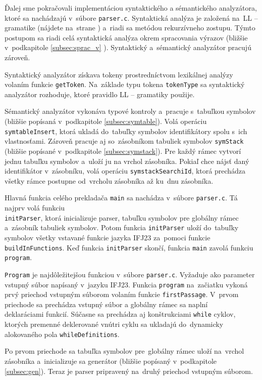 \documentclass[a4paper, 11pt]{article}
\begin{document}
Ďalej sme pokračovali implementáciou syntaktického a sémantického analyzátora, ktoré sa nachádzajú
v~súbore \texttt{parser.c}. Syntaktická analýza je založená na~LL -- gramatike (nájdete na~strane \pageref{tab:LL_gram}) a~riadi sa
metódou rekurzívneho zostupu. Týmto postupom sa riadi celá syntaktická analýza okrem spracovania výrazov (bližšie v~podkapitole \ref{subsec:sprac_v} ). Syntaktický a~sémantický analyzátor pracujú zároveň.

Syntaktický analyzátor získava tokeny prostredníctvom lexikálnej analýzy volaním funkcie \texttt{getToken}. Na~základe typu tokena \texttt{tokenType} sa syntaktický analyzátor rozhoduje, ktoré pravidlo LL -- gramatiky použije.

Sémantický analyzátor vykonáva typové kontroly a~pracuje s~tabuľkou symbolov (bližšie popísaná v~podkapitole \ref{subsec:symtable}). Volá operáciu \texttt{symtableInsert}, ktorá ukladá do~tabuľky symbolov identifikátory spolu s~ich vlastnosťami. Zároveň pracuje aj so~zásobníkom tabuliek symbolov \texttt{symStack} (bližšie popísané v~podkapitole \ref{subsec:symstack}).
Pre každý rámec vytvorí jednu tabuľku symbolov a~uloží ju na vrchol zásobníka. Pokiaľ chce nájsť
daný identifikátor v~zásobníku, volá operáciu \texttt{symstackSearchiId}, ktorá prechádza všetky rámce postupne od~vrcholu zásobníka až ku~dnu zásobníka.

Hlavná funkcia celého prekladača \texttt{main} sa nachádza v~súbore \texttt{parser.c}. Tá najprv volá funkciu\\
\texttt{initParser}, ktorá inicializuje parser, tabuľku symbolov pre globálny rámec a~zásobník tabuliek symbolov. Potom funkcia \texttt{initParser} uloží do~tabuľky symbolov všetky vstavané funkcie jazyka IFJ23 za~pomoci funkcie \texttt{buildInFunctions}. Keď funkcia \texttt{initParser} skončí, funkcia \texttt{main} zavolá funkciu \texttt{program}.

\texttt{Program} je najdôležitejšou funkciou v~súbore \texttt{parser.c}. Vyžaduje ako parameter vstupný súbor napísaný v~jazyku IFJ23. Funkcia \texttt{program} na~začiatku vykoná prvý priechod vstupným súborom volaním funkcie \texttt{firstPassage}. V~prvom priechode sa prechádza vstupný súbor a globálny rámec sa naplní \\ deklaráciami funkcií. Súčasne sa prechádza aj konštrukciami \texttt{while} cyklov, ktorých premenné deklerované vnútri cyklu sa ukladajú do~dynamicky alokovaného pola \texttt{whileDefinitions}.

Po prvom priechode sa tabuľka symbolov pre~globálny rámec uloží na~vrchol zásobníka a~inicializuje sa generátor
(bližšie popísaný v~podkapitole \ref{subsec:gen}). Teraz je parser pripravený na~druhý priechod vstupným súborom.
\end{document}
